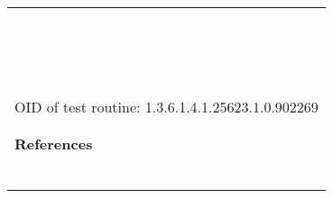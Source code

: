 \documentclass{article}
\begin{document}
\begin{longtable}{|p{}|}
\rowcolor{white}{\verb=  via brute force technique.=}\\
\rowcolor{white}{\verb=  Impact Level: System/Application=}\\
\rowcolor{white}{\verb=  Affected Software/OS:=}\\
\rowcolor{white}{\verb=  Microsoft Windows 7=}\\
\rowcolor{white}{\verb=  Microsoft Windows 2000 Service Pack and prior=}\\
\rowcolor{white}{\verb=  Microsoft Windows XP Service Pack 3 and prior=}\\
\rowcolor{white}{\verb=  Microsoft Windows Vista Service Pack 2 and prior=}\\
\rowcolor{white}{\verb=  Microsoft Windows Server 2003 Service Pack 2 and prior=}\\
\rowcolor{white}{\verb=  Microsoft Windows Server 2008 Service Pack 2 and prior=}\\
\rowcolor{white}{\verb=  Solution:=}\\
\rowcolor{white}{\verb=  Run Windows Update and update the listed hotfixes or download and=}\\
\rowcolor{white}{\verb=  update mentioned hotfixes in the advisory from the below link,=}\\
\rowcolor{white}{\verb=  http://www.microsoft.com/technet/security/bulletin/ms10-012.mspx=}\\
\rowcolor{white}{\verb==}\\
\rowcolor{white}{\verb==}\\
\\
OID of test routine: 1.3.6.1.4.1.25623.1.0.902269\\
\\

      \hline
      \\
\textbf{References}\\
\rowcolor{white}{\verb=CVE: CVE-2010-0020, CVE-2010-0021, CVE-2010-0022, CVE-2010-0231=}\\
\rowcolor{white}{\verb=Other:=}\\
\rowcolor{white}{\verb=  URL:http://secunia.com/advisories/38510/=}\\
\rowcolor{white}{\verb=   URL:http://support.microsoft.com/kb/971468=}\\
\rowcolor{white}{\verb=   URL:http://www.vupen.com/english/advisories/2010/0345=}\\
\rowcolor{white}{\verb=   URL:http://www.microsoft.com/technet/security/bulletin/ms10-012.mspx=}\\
\end{longtable}
\end{document}
